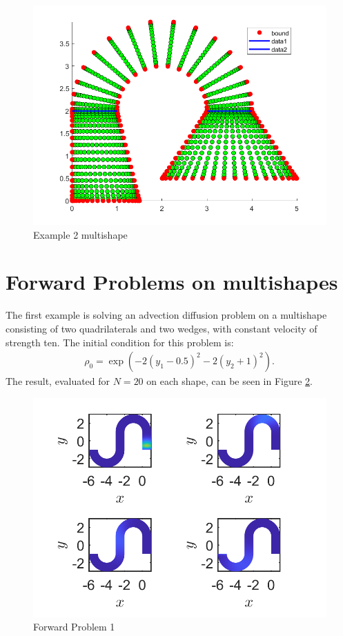 \documentclass[11pt, a4paper]{article}
\theoremstyle{definition}
\begin{document}
\begin{figure}[h]
	\centering
	\includegraphics[scale=0.5]{example2.png}
	\caption{Example 2 multishape} 
	\label{F7}
\end{figure}


\section{Forward Problems on multishapes}

The first example is solving an advection diffusion problem on a multishape consisting of two quadrilaterals and two wedges, with constant velocity of strength ten. The initial condition for this problem is:
 \begin{align*}
 	\rho_0 = \exp( -2(y_1 -0.5)^2 - 2 (y_2 + 1)^2).
 \end{align*}
The result, evaluated for $N= 20$ on each shape, can be seen in Figure \ref{F8}.

\begin{figure}[h]
	\centering
	\includegraphics[scale=0.5]{ex1.png}
	\caption{Forward Problem 1}
	\label{F8}
\end{figure}
\end{document}
